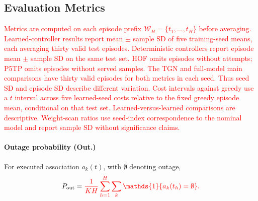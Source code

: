 \documentclass[10pt,letterpaper,journal]{IEEEtran}
\newcommand{\mathbbm}[1]{\mathds{#1}}
\newcommand{\revnew}[1]{\textcolor{red}{#1}}
\begin{document}
\subsection{Evaluation Metrics}
\label{subsec:metrics}

\revnew{Metrics are computed on each episode prefix $\mathcal W_H=\{t_1,\ldots,t_H\}$ before averaging. Learned-controller results report mean $\pm$ sample SD of five training-seed means, each averaging thirty valid test episodes. Deterministic controllers report episode mean $\pm$ sample SD on the same test set. HOF omits episodes without attempts; P5TP omits episodes without served samples. The TGN and full-model main comparisons have thirty valid episodes for both metrics in each seed. Thus seed SD and episode SD describe different variation. Cost intervals against greedy use a $t$ interval across five learned-seed costs relative to the fixed greedy episode mean, conditional on that test set. Learned-versus-learned comparisons are descriptive. Weight-scan ratios use seed-index correspondence to the nominal model and report sample SD without significance claims.}

\paragraph{Outage probability (Out.)}
For executed association $a_k(t)$, with $\emptyset$ denoting outage,
\begin{equation}
P_{\mathrm{out}}
=
\revnew{\frac{1}{KH}\sum_{h=1}^{H}\sum_{k}\mathbbm{1}\{a_k(t_h)=\emptyset\}.}
\label{eq:metric_out}
\end{equation}
\end{document}
